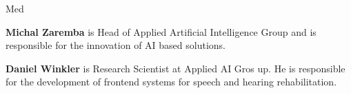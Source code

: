 \begin{sitedescription}{Med}
\begin{compactitem} %

\item{\bf Michal Zaremba} is Head of Applied Artificial Intelligence Group and is responsible for the innovation of AI based solutions.

\item{\bf Daniel Winkler} is Research Scientist at Applied AI Gros
  up. He is responsible for the development of frontend systems for speech and hearing rehabilitation.
    
\end{compactitem}

\end{sitedescription}


